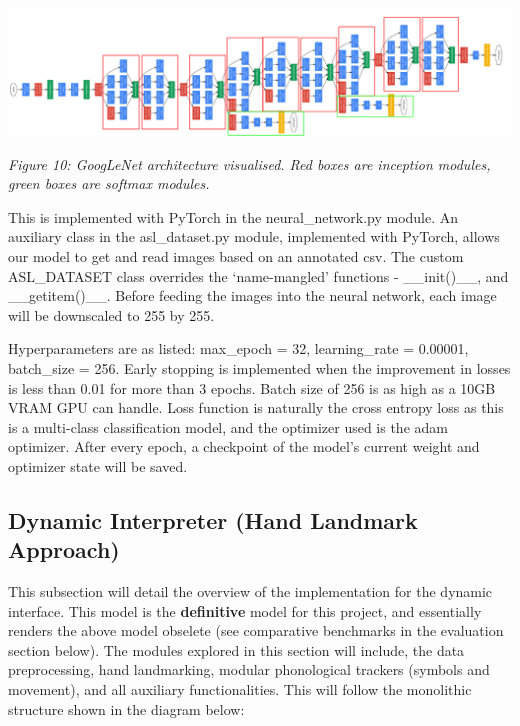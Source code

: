 \documentclass[11pt]{article}
\begin{document}
    \begin{center}
        \includegraphics[width=16cm]{images/googlenet.png}
        \\
        \raggedright \textit{
        Figure 10: GoogLeNet architecture visualised. Red boxes are inception modules, green boxes are softmax modules.
        }
    \end{center}

    This is implemented with PyTorch in the neural\_network.py module. An auxiliary class in the asl\_dataset.py module, implemented with PyTorch, allows our model to get and read images based on an annotated csv. The custom ASL\_DATASET class overrides the `name-mangled' functions - \_\_init()\_\_, and \_\_getitem()\_\_. Before feeding the images into the neural network, each image will be downscaled to 255 by 255.

    Hyperparameters are as listed: max\_epoch = 32, learning\_rate = 0.00001, batch\_size = 256. Early stopping is implemented when the improvement in losses is less than 0.01 for more than 3 epochs. Batch size of 256 is as high as a 10GB VRAM GPU can handle. Loss function is naturally the cross entropy loss as this is a multi-class classification model, and the optimizer used is the adam optimizer. After every epoch, a checkpoint of the model's current weight and optimizer state will be saved. 

    \subsection{Dynamic Interpreter (Hand Landmark Approach)}
    This subsection will detail the overview of the implementation for the dynamic interface. This model is the \textbf{definitive} model for this project, and essentially renders the above model obselete (see comparative benchmarks in the evaluation section below). The modules explored in this section will include, the data preprocessing, hand landmarking, modular phonological trackers (symbols and movement), and all auxiliary functionalities. This will follow the monolithic structure shown in the diagram below:
\end{document}
